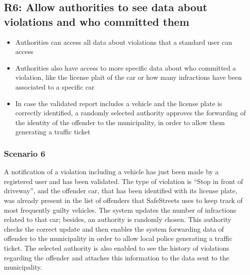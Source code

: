 \subsection{R6: Allow authorities to see data about violations and who committed them}
\begin{itemize}
    \item Authorities can access all data about violations that a standard user can access
    \item Authorities also have access to more specific data about who committed a violation, like the license plait of the car or how many infractions have been associated to a specific car
    \item In case the validated report includes a vehicle and the license plate is correctly identified, a randomly selected authority approves the forwarding of the identity of the offender to the municipality, in order to allow them generating a traffic ticket
\end{itemize}
\subsubsection{Scenario 6}
A notification of a violation including a vehicle has just been made by a registered user and has been validated. The type of violation is “Stop in front of driveway”, and the offender car, that has been identified with its license plate, was already present in the list of offenders that SafeStreets uses to keep track of most frequently guilty vehicles. The system updates the number of infractions related to that car; besides, an authority is randomly chosen. This authority checks the correct update and then enables the system forwarding data of offender to the municipality in order to allow local police generating a traffic ticket. The selected authority is also enabled to see the history of violations regarding the offender and attaches this information to the data sent to the municipality.

